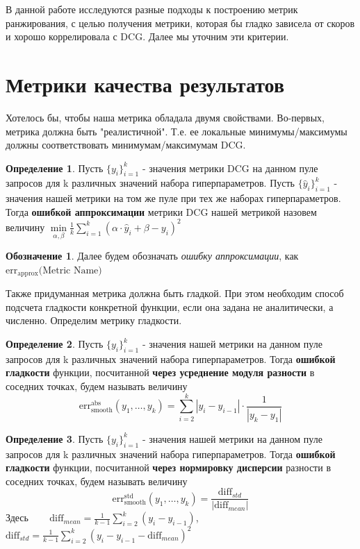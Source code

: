 \documentclass[14pt,a4paper]{amsart}
\theoremstyle{definition}
\newtheorem{definition}{Определение}[section]
\theoremstyle{definition}
\newtheorem{designation}{Обозначение}[section]
\newcommand{\Sum}{\sum\limits}
\renewcommand\i{\textit}
\renewcommand\t{\text}
\renewcommand\b{\textbf}
\begin{document}
В данной работе исследуются разные подходы к построению метрик ранжирования, с целью получения метрики, которая бы гладко зависела от скоров и хорошо коррелировала с DCG. Далее мы уточним эти критерии.\\


\newpage
\section{Метрики качества результатов}

Хотелось бы, чтобы наша метрика обладала двумя свойствами. Во-первых, метрика должна быть "реалистичной". Т.е. ее локальные минимумы/максимумы должны соответствовать минимумам/максимумам DCG.
\begin{definition}
Пусть $\{y_i\}_{i=1}^k$ - значения метрики DCG на данном пуле запросов для k различных значений набора гиперпараметров. Пусть $\{\hat{y}_i\}_{i=1}^k$ - значения нашей метрики на том же пуле при тех же наборах гиперпараметров. Тогда \b{ошибкой аппроксимации} метрики DCG нашей метрикой назовем величину
$\underset{\alpha, \beta}{\min}\frac{1}{k}\Sum_{i=1}^k (\alpha\cdot \hat{y}_i + \beta - y_i)^2$
\end{definition}

\begin{designation}
Далее будем обозначать \i{ошибку аппроксимации}, как $\t{err}_\t{approx}\t{(Metric Name)}$
\end{designation}

Также придуманная метрика должна быть гладкой. При этом необходим способ подсчета гладкости конкретной функции, если она задана не аналитически, а численно. Определим метрику гладкости.

\begin{definition}
Пусть $\{y_i\}_{i=1}^k$ - значения нашей метрики на данном пуле запросов для k различных значений набора гиперпараметров. Тогда \b{ошибкой гладкости} функции, посчитанной \b{через усреднение модуля разности} в соседних точках, будем называть величину 
$$\t{err}_\t{smooth}^\t{abs}(y_1,\dots,y_k) = \Sum_{i=2}^k |y_i - y_{i-1}| \cdot \frac{1}{|y_k - y_1|}$$
\end{definition}

\begin{definition}
Пусть $\{y_i\}_{i=1}^k$ - значения нашей метрики на данном пуле запросов для k различных значений набора гиперпараметров. Тогда \b{ошибкой гладкости} функции, посчитанной \b{через нормировку дисперсии} разности в соседних точках, будем называть величину 
$$\t{err}_\t{smooth}^\t{std}(y_1,\dots,y_k) = \frac{\t{diff}_{std}}{|\t{diff}_{mean}|}$$
Здесь ~~~ $\t{diff}_{mean} = \frac{1}{k - 1} \Sum_{i=2}^k (y_i - y_{i-1})$, ~~~
$\t{diff}_{std} = \frac{1}{k - 1} \Sum_{i=2}^k (y_i - y_{i-1} - \t{diff}_{mean})^2$
\end{definition}
\end{document}
